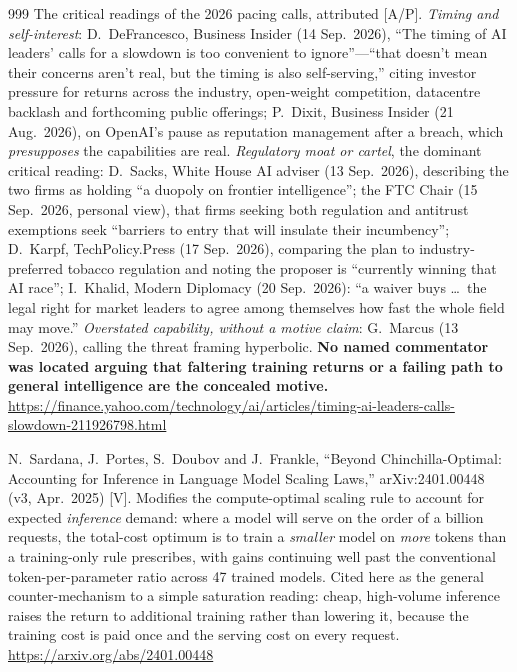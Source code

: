 \begin{thebibliography}{999}
 The critical readings of the 2026 pacing calls, attributed [A/P]. \emph{Timing and self-interest}: D.~DeFrancesco, Business Insider (14 Sep.\ 2026), ``The timing of AI leaders' calls for a slowdown is too convenient to ignore''---``that doesn't mean their concerns aren't real, but the timing is also self-serving,'' citing investor pressure for returns across the industry, open-weight competition, datacentre backlash and forthcoming public offerings; P.~Dixit, Business Insider (21 Aug.\ 2026), on OpenAI's pause as reputation management after a breach, which \emph{presupposes} the capabilities are real. \emph{Regulatory moat or cartel}, the dominant critical reading: D.~Sacks, White House AI adviser (13 Sep.\ 2026), describing the two firms as holding ``a duopoly on frontier intelligence''; the FTC Chair (15 Sep.\ 2026, personal view), that firms seeking both regulation and antitrust exemptions seek ``barriers to entry that will insulate their incumbency''; D.~Karpf, TechPolicy.Press (17 Sep.\ 2026), comparing the plan to industry-preferred tobacco regulation and noting the proposer is ``currently winning that AI race''; I.~Khalid, Modern Diplomacy (20 Sep.\ 2026): ``a waiver buys \ldots\ the legal right for market leaders to agree among themselves how fast the whole field may move.'' \emph{Overstated capability, without a motive claim}: G.~Marcus (13 Sep.\ 2026), calling the threat framing hyperbolic. \textbf{No named commentator was located arguing that faltering training returns or a failing path to general intelligence are the concealed motive.} \url{https://finance.yahoo.com/technology/ai/articles/timing-ai-leaders-calls-slowdown-211926798.html}


 N.~Sardana, J.~Portes, S.~Doubov and J.~Frankle, ``Beyond Chinchilla-Optimal: Accounting for Inference in Language Model Scaling Laws,'' arXiv:2401.00448 (v3, Apr.\ 2025) [V]. Modifies the compute-optimal scaling rule to account for expected \emph{inference} demand: where a model will serve on the order of a billion requests, the total-cost optimum is to train a \emph{smaller} model on \emph{more} tokens than a training-only rule prescribes, with gains continuing well past the conventional token-per-parameter ratio across 47 trained models. Cited here as the general counter-mechanism to a simple saturation reading: cheap, high-volume inference raises the return to additional training rather than lowering it, because the training cost is paid once and the serving cost on every request. \url{https://arxiv.org/abs/2401.00448}


\end{thebibliography}
